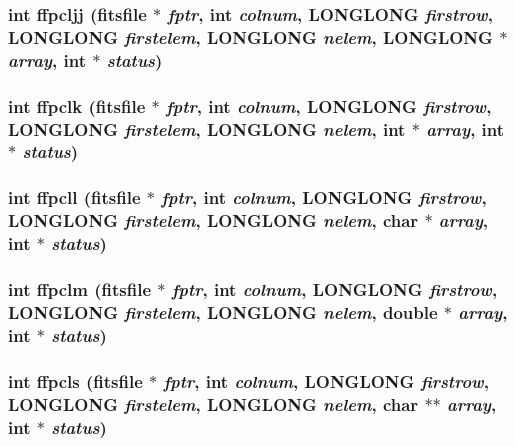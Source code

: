 \subsubsection{\setlength{\rightskip}{0pt plus 5cm}int ffpcljj (\bf{fitsfile} $\ast$ {\em fptr}, int {\em colnum}, \bf{LONGLONG} {\em firstrow}, \bf{LONGLONG} {\em firstelem}, \bf{LONGLONG} {\em nelem}, \bf{LONGLONG} $\ast$ {\em array}, int $\ast$ {\em status})}\label{fitsio_8h_65ee3dc7c6f9893ec471ba73d3a9779d}


\subsubsection{\setlength{\rightskip}{0pt plus 5cm}int ffpclk (\bf{fitsfile} $\ast$ {\em fptr}, int {\em colnum}, \bf{LONGLONG} {\em firstrow}, \bf{LONGLONG} {\em firstelem}, \bf{LONGLONG} {\em nelem}, int $\ast$ {\em array}, int $\ast$ {\em status})}\label{fitsio_8h_d4e01a4e0406be50e5e104f31f5c8fea}


\subsubsection{\setlength{\rightskip}{0pt plus 5cm}int ffpcll (\bf{fitsfile} $\ast$ {\em fptr}, int {\em colnum}, \bf{LONGLONG} {\em firstrow}, \bf{LONGLONG} {\em firstelem}, \bf{LONGLONG} {\em nelem}, char $\ast$ {\em array}, int $\ast$ {\em status})}\label{fitsio_8h_353d8ec816b71620a84af201290d5932}


\subsubsection{\setlength{\rightskip}{0pt plus 5cm}int ffpclm (\bf{fitsfile} $\ast$ {\em fptr}, int {\em colnum}, \bf{LONGLONG} {\em firstrow}, \bf{LONGLONG} {\em firstelem}, \bf{LONGLONG} {\em nelem}, double $\ast$ {\em array}, int $\ast$ {\em status})}\label{fitsio_8h_af1f2dc6beaea63dbf91a8be037be940}


\subsubsection{\setlength{\rightskip}{0pt plus 5cm}int ffpcls (\bf{fitsfile} $\ast$ {\em fptr}, int {\em colnum}, \bf{LONGLONG} {\em firstrow}, \bf{LONGLONG} {\em firstelem}, \bf{LONGLONG} {\em nelem}, char $\ast$$\ast$ {\em array}, int $\ast$ {\em status})}\label{fitsio_8h_d58114695cd1281daa17eff622c1e38a}


